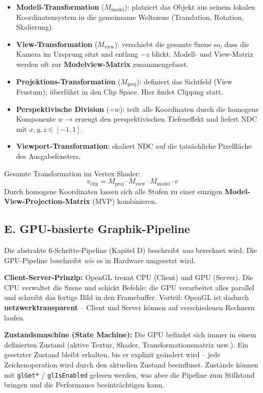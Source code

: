 \documentclass[12pt, a4paper]{article}
\begin{document}
\begin{itemize}
  \item \textbf{Modell-Transformation} ($M_\text{model}$): platziert das Objekt aus seinem lokalen Koordinatensystem in die gemeinsame Weltszene (Translation, Rotation, Skalierung).
  \item \textbf{View-Transformation} ($M_\text{view}$): verschiebt die gesamte Szene so, dass die Kamera im Ursprung sitzt und entlang $-z$ blickt. Modell- und View-Matrix werden oft zur \textbf{Modelview-Matrix} zusammengefasst.
  \item \textbf{Projektions-Transformation} ($M_\text{proj}$): definiert das Sichtfeld (View Frustum); überführt in den Clip Space. Hier findet Clipping statt.
  \item \textbf{Perspektivische Division} ($\div w$): teilt alle Koordinaten durch die homogene Komponente $w$ → erzeugt den perspektivischen Tiefeneffekt und liefert NDC mit $x,y,z \in [-1,1]$.
  \item \textbf{Viewport-Transformation}: skaliert NDC auf die tatsächliche Pixelfläche des Ausgabefensters.
\end{itemize}

Gesamte Transformation im Vertex Shader:
\[
  v_\text{clip} = M_\text{proj} \cdot M_\text{view} \cdot M_\text{model} \cdot v
\]
Durch homogene Koordinaten lassen sich alle Stufen zu einer einzigen \textbf{Model-View-Projection-Matrix} (MVP) kombinieren.

\subsection*{E. GPU-basierte Graphik-Pipeline}

Die abstrakte 6-Schritte-Pipeline (Kapitel D) beschreibt \textit{was} berechnet wird. Die GPU-Pipeline beschreibt \textit{wie} es in Hardware umgesetzt wird.

\textbf{Client-Server-Prinzip:} OpenGL trennt CPU (Client) und GPU (Server). Die CPU verwaltet die Szene und schickt Befehle; die GPU verarbeitet alles parallel und schreibt das fertige Bild in den Framebuffer. Vorteil: OpenGL ist dadurch \textbf{netzwerktransparent} -- Client und Server können auf verschiedenen Rechnern laufen.

\medskip
\textbf{Zustandsmaschine (State Machine):} Die GPU befindet sich immer in einem definierten Zustand (aktive Textur, Shader, Transformationsmatrix usw.). Ein gesetzter Zustand bleibt erhalten, bis er explizit geändert wird -- jede Zeichenoperation wird durch den aktuellen Zustand beeinflusst. Zustände können mit \texttt{glGet*} / \texttt{glIsEnabled} gelesen werden, was aber die Pipeline zum Stillstand bringen und die Performance beeinträchtigen kann.
\end{document}
